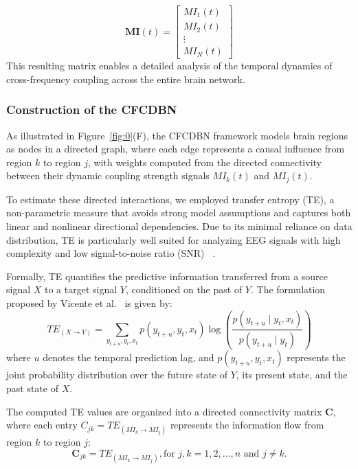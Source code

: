 \documentclass[lettersize,journal]{IEEEtran}
\begin{document}
\begin{equation}
\mathbf{MI}(t) =
\begin{bmatrix}
MI_1(t) \\
MI_2(t) \\
\vdots \\
MI_N(t)
\label{13}
\end{bmatrix}
\end{equation}
This resulting matrix enables a detailed analysis of the temporal dynamics of cross-frequency coupling across the entire brain network.

\subsubsection{Construction of the CFCDBN}  


As illustrated in Figure~\ref{fig:0}(F), the CFCDBN framework models brain regions as nodes in a directed graph, where each edge represents a causal influence from region \( k \) to region \( j \), with weights computed from the directed connectivity between their dynamic coupling strength signals \( MI_k(t) \) and \( MI_j(t) \).

To estimate these directed interactions, we employed transfer entropy (TE), a non-parametric measure that avoids strong model assumptions and captures both linear and nonlinear directional dependencies. Due to its minimal reliance on data distribution, TE is particularly well suited for analyzing EEG signals with high complexity and low signal-to-noise ratio (SNR)~ \cite{harmah2020measuring}.

Formally, TE quantifies the predictive information transferred from a source signal \( X \) to a target signal \( Y \), conditioned on the past of \( Y \). The formulation proposed by Vicente et al.~ \cite{vicente2011transfer} is given by:
\begin{equation}
TE_{(X \rightarrow Y)} = \sum_{y_{t+u}, y_t, x_t} p(y_{t+u}, y_t, x_t) \log \left( \frac{p(y_{t+u} \mid y_t, x_t)}{p(y_{t+u} \mid y_t)} \right)
\label{14}
\end{equation}
where \( u \) denotes the temporal prediction lag, and \( p(y_{t+u}, y_t, x_t) \) represents the joint probability distribution over the future state of \( Y \), its present state, and the past state of \( X \).


The computed TE values are organized into a directed connectivity matrix \( \mathbf{C} \), where each entry \( C_{jk} = TE_{(MI_k \rightarrow MI_j)} \) represents the information flow from region \( k \) to region \( j \):
\begin{equation}
\mathbf{C}_{jk} = TE_{(MI_k \rightarrow MI_j)}, \text{for } j, k = 1, 2, \dots, n \text{ and } j \ne k.
\label{15}
\end{equation}
\end{document}
